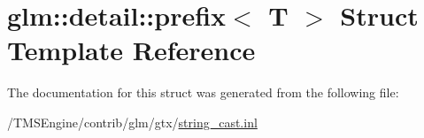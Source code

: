 \hypertarget{structglm_1_1detail_1_1prefix}{}\section{glm\+:\+:detail\+:\+:prefix$<$ T $>$ Struct Template Reference}
\label{structglm_1_1detail_1_1prefix}


The documentation for this struct was generated from the following file\+:\begin{DoxyCompactItemize}
\item 
/\+T\+M\+S\+Engine/contrib/glm/gtx/\hyperlink{string__cast_8inl}{string\+\_\+cast.\+inl}\end{DoxyCompactItemize}
